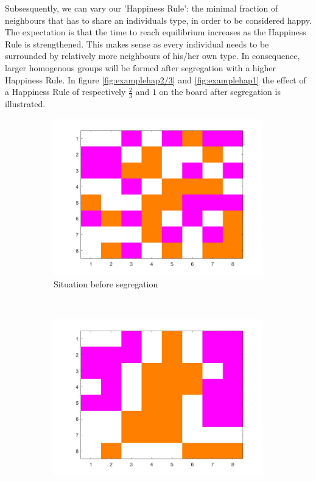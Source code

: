 Subsesquently, we can vary our 'Happiness Rule': the minimal fraction of neighbours that has to share an individuals type, in order to be considered happy.
The expectation is that the time to reach equilibrium increases as the Happiness Rule is strengthened.
This makes sense as every individual needs to be surrounded by relatively more neighbours of his/her own type.
In consequence, larger homogenous groups will be formed after segregation with a higher Happiness Rule.
In figure \ref{fig:examplehap2/3} and \ref{fig:examplehap1} the effect of a Happiness Rule of respectively $\frac{2}{3}$ and $1$ on the board after segregation is illustrated.

\begin{figure}[H]
	\centering
    \begin{subfigure}{0.4\textwidth}
        \includegraphics[width=\textwidth]{vb3beginbord.jpg}
        \caption{Situation before segregation}
        \label{fig:example hap 2/3 begin}
    \end{subfigure}\hspace{0cm}
    ~ 
    \begin{subfigure}{0.4\textwidth}
        \includegraphics[width=\textwidth]{vb3eindbord.jpg}

\end{subfigure}
\end{figure}
